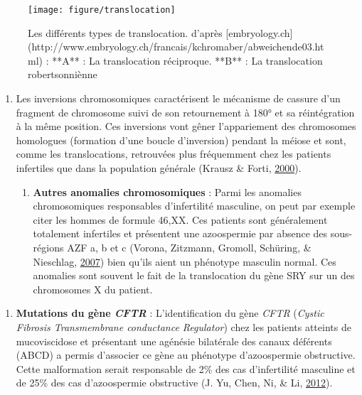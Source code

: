 \documentclass[12pt,twoside]{reedthesis}
\providecommand{\tightlist}{%
  \setlength{\itemsep}{0pt}\setlength{\parskip}{0pt}}
\theoremstyle{definition}
\theoremstyle{definition}
\theoremstyle{remark}
\begin{document}
  \begin{figure}
  
  {\centering \texttt{[image: figure/translocation]} 
  
  }
  
  \caption[Les différents types de translocation.]{Les différents types de translocation. d'après [embryology.ch](http://www.embryology.ch/francais/kchromaber/abweichende03.html) :  **A** : La translocation réciproque. **B** : La translocation robertsonniènne}\label{fig:figtranslocation}
  \end{figure}
  
  \begin{enumerate}
  \def\labelenumi{\roman{enumi}.}
  \setcounter{enumi}{1}
  \item
    Les inversions chromosomiques caractérisent le mécanisme de cassure
    d'un fragment de chromosome suivi de son retournement à 180° et sa
    réintégration à la même position. Ces inversions vont gêner
    l'appariement des chromosomes homologues (formation d'une boucle
    d'inversion) pendant la méiose et sont, comme les translocations,
    retrouvées plus fréquemment chez les patients infertiles que dans la
    population générale (Krausz \& Forti,
    \protect\hyperlink{ref-Krausz2000}{2000}).
  
    \begin{enumerate}
    \def\labelenumii{\alph{enumii}.}
    \setcounter{enumii}{2}
    \tightlist
    \item
      \textbf{Autres anomalies chromosomiques} : Parmi les anomalies
      chromosomiques responsables d'infertilité masculine, on peut par
      exemple citer les hommes de formule 46,XX. Ces patients sont
      généralement totalement infertiles et présentent une azoospermie par
      absence des sous- régions AZF a, b et c (Vorona, Zitzmann, Gromoll,
      Schüring, \& Nieschlag, \protect\hyperlink{ref-Vorona2007}{2007})
      bien qu'ils aient un phénotype masculin normal. Ces anomalies sont
      souvent le fait de la translocation du gène SRY sur un des
      chromosomes X du patient.
    \end{enumerate}
  \end{enumerate}
  
  \begin{enumerate}
  \def\labelenumi{\arabic{enumi}.}
  \setcounter{enumi}{2}
  \tightlist
  \item
    \textbf{Mutations du gène \emph{CFTR} }: L'identification du gène
    \emph{CFTR} (\emph{Cystic Fibrosis Transmembrane conductance
    Regulator}) chez les patients atteints de mucoviscidose et présentant
    une agénésie bilatérale des canaux déférents (ABCD) a permis
    d'associer ce gène au phénotype d'azoospermie obstructive. Cette
    malformation serait responsable de 2\% des cas d'infertilité masculine
    et de 25\% des cas d'azoospermie obstructive (J. Yu, Chen, Ni, \& Li,
    \protect\hyperlink{ref-Yu2012}{2012}).
  \end{enumerate}
  
\end{document}
